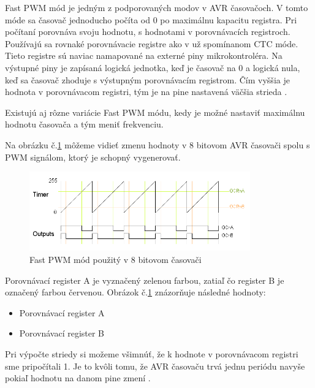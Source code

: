 \noindent \par
Fast PWM mód je jedným z podporovaných modov v AVR časovačoch. V tomto móde sa časovač jednoducho počíta od 0 po maximálnu kapacitu registra. Pri počítaní porovnáva svoju hodnotu, s hodnotami v porovnávacích registroch.
Používajú sa rovnaké porovnávacie registre ako v už spomínanom CTC móde. Tieto registre sú naviac namapované na externé piny mikrokontroléra.
Na výstupné piny je zapísaná logická jednotka, keď je časovač na 0 a logická nula, keď sa časovač zhoduje s výstupným porovnávacím registrom. Čím vyššia je hodnota
v porovnávacom registri, tým je na pine nastavená väčšia strieda \cite{shirriffSecretsArduinoPWM}. \par
Existujú aj rôzne variácie Fast PWM módu, kedy je možné nastaviť maximálnu hodnotu časovača a tým meniť frekvenciu. \par
Na obrázku č.\ref{figure:fast-pwm-mode} môžeme vidieť zmenu hodnoty v 8 bitovom AVR časovači spolu s PWM signálom, ktorý je schopný vygenerovať.
\begin{figure}[!h]
    \centering
    \includegraphics[width=0.85\textwidth]{img/fast-pwm-graph.png}
    \caption{Fast PWM mód použitý v 8 bitovom časovači}
    \label{figure:fast-pwm-mode}
\end{figure}

Porovnávací register A je vyznačený zelenou farbou, zatiaľ čo register B je označený farbou červenou. Obrázok č.\ref{figure:fast-pwm-mode} znázorňuje následné hodnoty:
\begin{itemize}
    \item Porovnávací register A
    \item Porovnávací register B
\end{itemize}

Pri výpočte striedy si možeme všimnúť, že k hodnote v porovnávacom registri sme pripočítali 1. Je to kvôli tomu, že AVR časovaču trvá jednu periódu navyše pokiaľ hodnotu
na danom pine zmení \cite{shirriffSecretsArduinoPWM}.

